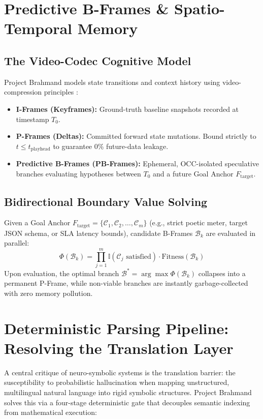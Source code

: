 \documentclass[11pt,a4paper]{article}
\theoremstyle{definition}
\begin{document}
\section{Predictive B-Frames \& Spatio-Temporal Memory}

\subsection{The Video-Codec Cognitive Model}
Project Brahmand models state transitions and context history using video-compression principles \cite{chandramouli2026timemeshin}:
\begin{itemize}
    \item \textbf{I-Frames (Keyframes):} Ground-truth baseline snapshots recorded at timestamp $T_0$.
    \item \textbf{P-Frames (Deltas):} Committed forward state mutations. Bound strictly to $t \le t_{\text{playhead}}$ to guarantee 0\% future-data leakage.
    \item \textbf{Predictive B-Frames (PB-Frames):} Ephemeral, OCC-isolated speculative branches evaluating hypotheses between $T_0$ and a future Goal Anchor $F_{\text{target}}$.
\end{itemize}

\subsection{Bidirectional Boundary Value Solving}
Given a Goal Anchor $F_{\text{target}} = \{\mathcal{C}_1, \mathcal{C}_2, \dots, \mathcal{C}_m\}$ (e.g., strict poetic meter, target JSON schema, or SLA latency bounds), candidate B-Frames $\mathcal{B}_k$ are evaluated in parallel:
\begin{equation}
\Phi(\mathcal{B}_k) = \prod_{j=1}^m \mathbb{I}(\mathcal{C}_j \text{ satisfied}) \cdot \text{Fitness}(\mathcal{B}_k)
\end{equation}
Upon evaluation, the optimal branch $\mathcal{B}^* = \arg\max \Phi(\mathcal{B}_k)$ collapses into a permanent P-Frame, while non-viable branches are instantly garbage-collected with zero memory pollution.

\section{Deterministic Parsing Pipeline: Resolving the Translation Layer}
A central critique of neuro-symbolic systems is the translation barrier: the susceptibility to probabilistic hallucination when mapping unstructured, multilingual natural language into rigid symbolic structures. Project Brahmand solves this via a four-stage deterministic gate that decouples semantic indexing from mathematical execution:
\end{document}
